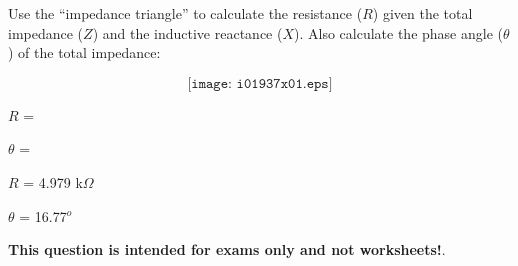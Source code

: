 

Use the ``impedance triangle'' to calculate the resistance ($R$) given the total impedance ($Z$) and the inductive reactance ($X$).  Also calculate the phase angle ($\theta$) of the total impedance:

$$\texttt{[image: i01937x01.eps]}$$

\vskip 20pt

$R$ = 

\vskip 10pt

$\theta$ = 







$R$ = 4.979 k$\Omega$

\vskip 10pt

$\theta$ = 16.77$^{o}$







{\bf This question is intended for exams only and not worksheets!}.




